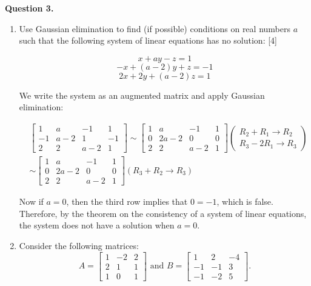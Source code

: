\documentclass[11pt]{article}
\begin{document}
\textbf{Question 3.}
\begin{enumerate}[label=\alph*)]
    \item Use Gaussian elimination to find (if possible) conditions on real numbers \(a\) such that the following system of linear equations
    has no solution: \hfill [4]

    \[ x + ay - z = 1\]
    \[ -x + (a-2)y + z = -1\]
    \[ 2x + 2y + (a-2)z = 1\]
    
    \color{blue}
    We write the system as an augmented matrix and apply Gaussian elimination:

    \[
    \begin{aligned}
        &\left[
            \begin{array}{ccc|c}
                1 & a & -1 & 1\\
                -1 & a-2 & 1 & -1\\
                2 & 2 & a-2 & 1
            \end{array}
        \right] \sim
        \left[
            \begin{array}{ccc|c}
                1 & a & -1 & 1\\
                0 & 2a-2 & 0 & 0\\
                2 & 2 & a-2 & 1
            \end{array}
        \right]
        \left(
            \begin{array}{c}
             R_2 + R_1 \rightarrow R_2\\
            R_3 - 2R_1 \rightarrow R_3   
            \end{array}
        \right) \\
        &\sim
        \left[
            \begin{array}{ccc|c}
                1 & a & -1 & 1\\
                0 & 2a-2 & 0 & 0\\
                2 & 2 & a-2 & 1
            \end{array}
        \right]
        \left(
            R_3 + R_2 \rightarrow R_3
        \right)
        \end{aligned}
    \]

    Now if \(a = 0\), then the third row implies that \(0 = -1\), which is false.\\
    Therefore, by the theorem on the consistency of a system of linear equations,
    the system does not have a solution when \(a = 0\).
    \color{black}
    \item Consider the following matrices:
    \[
A = \begin{bmatrix}
1 & -2 & 2 \\
2 & 1 & 1 \\
1 & 0 & 1
\end{bmatrix}
\text{ and } 
B = \begin{bmatrix}
    1 & 2 & -4 \\
    -1 & -1 & 3 \\
    -1 & -2 & 5
\end{bmatrix}.
\]


\end{enumerate}
\end{document}
